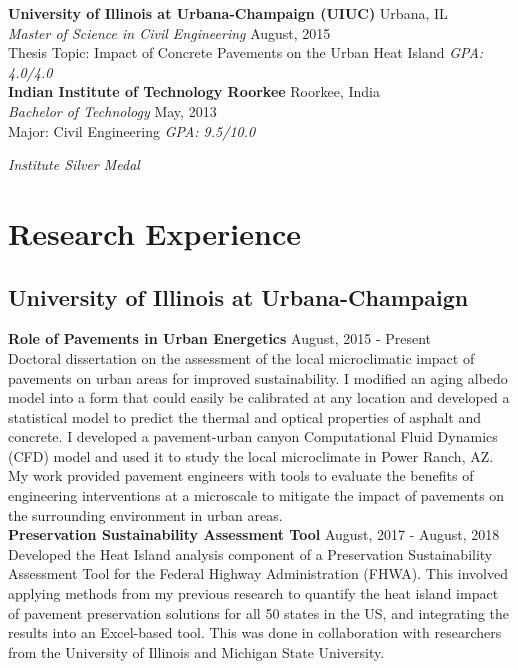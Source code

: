 \documentclass[12pt]{article}
\begin{document}
\textbf{University of Illinois at Urbana-Champaign (UIUC)} \hfill Urbana, IL\\
\textit{Master of Science in Civil Engineering} \hfill August, 2015\\
Thesis Topic: Impact of Concrete Pavements on the Urban Heat Island \hfill \textit{GPA: 4.0/4.0} \\

\textbf{Indian Institute of Technology Roorkee} \hfill Roorkee, India\\
\textit{Bachelor of Technology} \hfill May, 2013\\
Major: Civil Engineering \hfill \textit{GPA: 9.5/10.0} \\
\strut \hfill \textit{Institute Silver Medal} \\ %

\section*{Research Experience}
\subsection*{University of Illinois at Urbana-Champaign}
\textbf{Role of Pavements in Urban Energetics} \hfill August, 2015 - Present \\
Doctoral dissertation on the assessment of the local microclimatic impact of pavements on urban areas for improved sustainability. I modified an aging albedo model into a form that could easily be calibrated at any location and developed a statistical model to predict the thermal and optical properties of asphalt and concrete. I developed a pavement-urban canyon Computational Fluid Dynamics (CFD) model and used it to study the local microclimate in Power Ranch, AZ. My work provided pavement engineers with tools to evaluate the benefits of engineering interventions at a microscale to mitigate the impact of pavements on the surrounding environment in urban areas.\\

\textbf{Preservation Sustainability Assessment Tool} \hfill August, 2017 - August, 2018\\
Developed the Heat Island analysis component of a Preservation Sustainability Assessment Tool for the Federal Highway Administration (FHWA). This involved applying methods from my previous research to quantify the heat island impact of pavement preservation solutions for all 50 states in the US, and integrating the results into an Excel-based tool. This was done in collaboration with researchers from the University of Illinois and Michigan State University. \\
\end{document}
